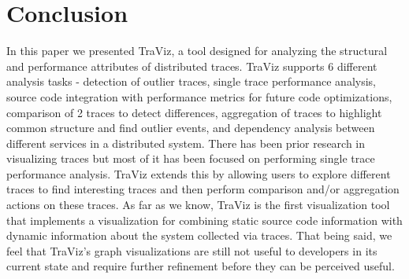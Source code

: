 \section{Conclusion}

In this paper we presented TraViz, a tool designed
for analyzing the structural and performance attributes
of distributed traces. TraViz supports 6 different analysis
tasks - detection of outlier traces, single trace performance analysis,
source code integration with performance metrics for future code optimizations,
comparison of 2 traces to detect differences, aggregation of traces to
highlight common structure and find outlier events, and dependency analysis
between different services in a distributed system.
There has been prior research in visualizing traces but most of it has been
focused on performing single trace performance analysis. TraViz extends
this by allowing users to explore different traces to find interesting traces
and then perform comparison and/or aggregation actions on these traces.
As far as we know, TraViz is the first visualization tool that implements
a visualization for combining static source code information with
dynamic information about the system collected via traces. 
That being said, we feel that TraViz's graph visualizations are still not
useful to developers in its current state and require further refinement
before they can be perceived useful.